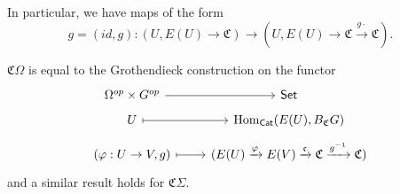 \documentclass[a4paper,10pt
]{article}%
\renewcommand{\phi}{\varphi}
\renewcommand{\1}{\ensuremath{\mathbb{id}}}
\begin{document}
In particular, we have maps of the form
\begin{equation}
      g = (id, g): (U, E(U) \to \mathfrak C) \to (U, E(U) \to \mathfrak C \xrightarrow{g \cdot} \mathfrak C). 
\end{equation}

\begin{remark}
      $\mathfrak C \Omega$ is equal to the
      Grothendieck construction on the functor
      \begin{equation}
            \label{COMEGA_B_GR_EQ}
            \begin{tikzcd}[row sep = tiny]
                  \Omega^{op} \times G^{op} \arrow[r]
                  &
                  \mathsf{Set}
                  \\
                  U \arrow[r, mapsto]
                  &
                  \Hom_{\mathsf{Cat}}(E(U), B_{\mathfrak C}G)
                  \\
                  (\phi: U \to V, g) \arrow[r, mapsto]
                  &
                  (E(U) \xrightarrow{\phi} E(V) \xrightarrow{\mathfrak c} \mathfrak C \xrightarrow{g^{-1}} \mathfrak C)
            \end{tikzcd}
      \end{equation}
      and a similar result holds for $\mathfrak C \Sigma$. 
\end{remark}
\end{document}

